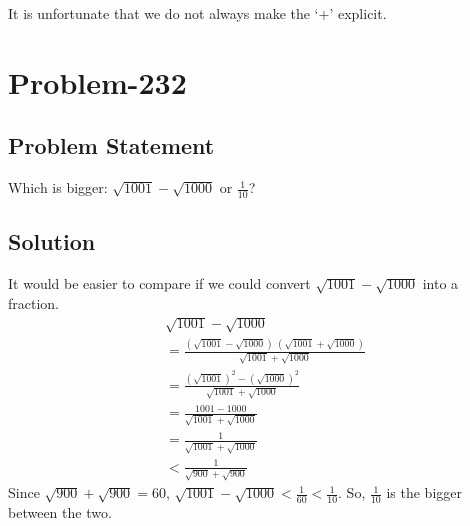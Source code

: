 \documentclass[12pt]{article}
\begin{document}
It is unfortunate that we do not always make the `+' explicit.

\section*{Problem-232}
\subsection*{Problem Statement}
Which is bigger: $\sqrt{1001} - \sqrt{1000}$ or $\frac{1}{10}$?
\subsection*{Solution}
It would be easier to compare if we could convert $\sqrt{1001} - \sqrt{1000}$ into a fraction.
\begin{equation*}
	\begin{aligned}
		& \sqrt{1001} - \sqrt{1000}\\
		&= \frac{ \left(\sqrt{1001} - \sqrt{1000}\right)\ \left(\sqrt{1001} + \sqrt{1000}\right) }{ \sqrt{1001} + \sqrt{1000} }\\
		&= \frac{ \left( \sqrt{1001} \right)^2 - \left( \sqrt{1000} \right)^2 }{ \sqrt{1001} + \sqrt{1000} }\\
		&= \frac{1001 - 1000}{ \sqrt{1001} + \sqrt{1000} }\\
		&= \frac{1}{ \sqrt{1001} + \sqrt{1000} }\\
		&< \frac{1}{ \sqrt{900} + \sqrt{900} }
	\end{aligned}
\end{equation*}
Since $\sqrt{900} + \sqrt{900} = 60$, $\sqrt{1001} - \sqrt{1000} < \frac{1}{60} < \frac{1}{10}$. So, $\frac{1}{10}$ is the bigger between the two.
\end{document}

